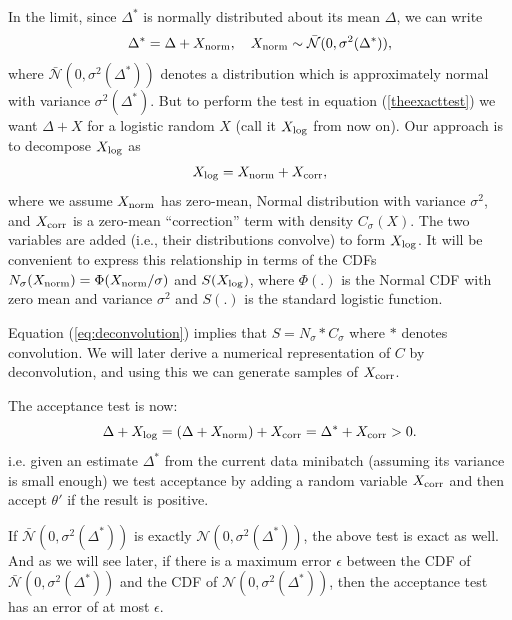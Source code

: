 \documentclass{article}
\begin{document}
In the limit, since $\Delta^*$ is normally distributed about its mean $\Delta$, we
can write
\begin{equation}\label{eq:relationship}
\Delta^* = \Delta + X_{\rm norm}, \quad X_{\rm norm} \sim \mathcal{\bar{N}}(0, \sigma^2(\Delta^*)),
\end{equation}
where $\mathcal{\bar{N}}(0, \sigma^2(\Delta^*))$ denotes a distribution which is approximately
normal with variance $\sigma^2(\Delta^*)$. 
But to perform the test in equation (\ref{theexacttest}) we want $\Delta + X$ for
a logistic random $X$ (call it $X_{\rm log}$ from now on). 
Our approach is to decompose $X_{\rm log}$ as
\begin{equation}\label{eq:deconvolution}
X_{\rm log} = X_{\rm norm}+X_{\rm corr},
\end{equation}
where we assume $X_{\rm norm}$ has zero-mean, Normal distribution with
variance $\sigma^2$, and $X_{\rm corr}$ is a zero-mean ``correction''
term with density $C_{\sigma}(X)$.  The two variables are added
(i.e., their distributions convolve) to form $X_{\rm log}$. It will be
convenient to express this relationship in terms of the CDFs $N_{\sigma}(X_{\rm
  norm}) = \Phi(X_{\rm norm}/\sigma)$ and $S(X_{\rm log})$, where
$\Phi(.)$ is the Normal CDF with zero mean and variance $\sigma^2$ and
$S(.)$ is the standard logistic function.
 
Equation (\ref{eq:deconvolution}) implies that $S = N_{\sigma} * C_{\sigma}$ where $*$ denotes convolution. We will later
derive a numerical representation of $C$ by deconvolution, and using this we can generate
samples of $X_{\rm corr}$. 

  The acceptance test is now:
\begin{equation}\label{eq:criteria}
\Delta + X_{\rm log} = (\Delta + X_{\rm norm}) + X_{\rm corr} = \Delta^* + X_{\rm corr} >0.
\end{equation}
i.e. given an estimate $\Delta^*$ from the current data minibatch (assuming its
variance is small enough) we test acceptance by adding a random variable $X_{\rm corr}$ and
then accept $\theta'$ if the result is positive.

If $\mathcal{\bar{N}}(0, \sigma^2(\Delta^*))$ is exactly $\mathcal{N}(0, \sigma^2(\Delta^*))$,
the above test is exact as well. And as we will see later,  if there is a maximum error $\epsilon$ between
the CDF of $\mathcal{\bar{N}}(0, \sigma^2(\Delta^*))$ and the CDF of $\mathcal{N}(0, \sigma^2(\Delta^*))$,
then the acceptance test has an error of at most $\epsilon$. 
\end{document}
